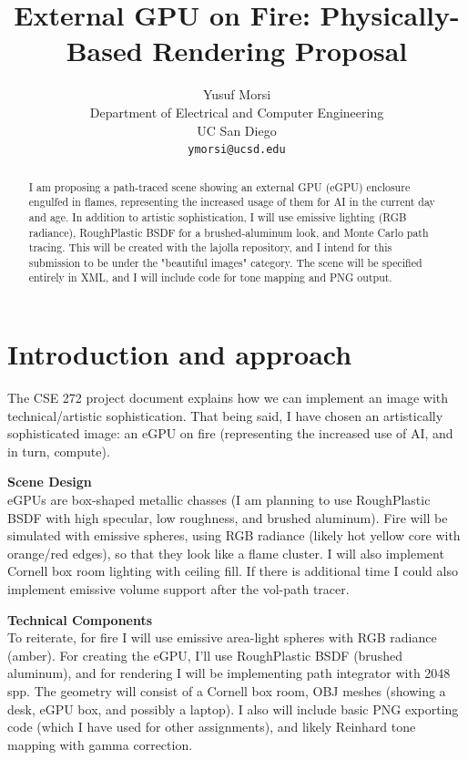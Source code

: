 \documentclass{article}
\title{External GPU on Fire: Physically-Based Rendering Proposal}
\author{%
  Yusuf Morsi \\
  Department of Electrical and Computer Engineering\\
  UC San Diego\\
  \texttt{ymorsi@ucsd.edu} \\
}
\begin{document}
\maketitle


\begin{abstract}
I am proposing a path-traced scene showing an external GPU (eGPU) enclosure 
engulfed in flames, representing the increased usage of them for AI in the 
current day and age. In addition to artistic sophistication, I will use 
emissive lighting (RGB radiance), RoughPlastic BSDF for a brushed-aluminum 
look, and Monte Carlo path tracing. This will be created with the lajolla 
repository, and I intend for this submission to be under the "beautiful 
images" category. The scene will be specified entirely in XML, and I will 
include code for tone mapping and PNG output.
\end{abstract}


\section{Introduction and approach}

The CSE 272 project document explains how we can implement an image with technical/artistic sophistication. That being said, I have chosen an artistically sophisticated image: an eGPU on fire (representing the increased use of AI, and in turn, compute).

\textbf{Scene Design} \\ eGPUs are box-shaped metallic chasses (I am planning to use RoughPlastic BSDF with high specular, low roughness, and brushed aluminum). Fire will be simulated with emissive spheres, using RGB radiance (likely hot yellow core with orange/red edges), so that they look like a flame cluster. I will also implement Cornell box room lighting with ceiling fill. If there is additional time I could also implement emissive volume support after the vol-path tracer.

\textbf{Technical Components} \\ To reiterate, for fire I will use emissive area-light spheres with RGB radiance (amber). For creating the eGPU, I'll use RoughPlastic BSDF (brushed aluminum), and for rendering I will be implementing path integrator with 2048 spp. The geometry will consist of a Cornell box room, OBJ meshes (showing a desk, eGPU box, and possibly a laptop). I also will include basic PNG exporting code (which I have used for other assignments), and likely Reinhard tone mapping with gamma correction.
\end{document}
